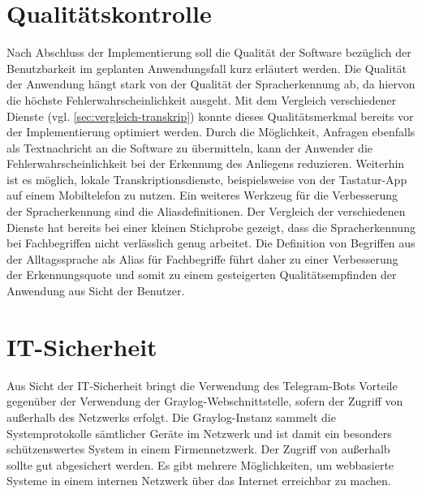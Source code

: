 \section{Qualitätskontrolle}

Nach Abschluss der Implementierung soll die Qualität der Software bezüglich der Benutzbarkeit im geplanten Anwendungsfall kurz erläutert werden. Die Qualität der Anwendung hängt stark von der Qualität der Spracherkennung ab, da hiervon die höchste Fehlerwahrscheinlichkeit ausgeht. Mit dem Vergleich verschiedener Dienste (vgl. \autoref{sec:vergleich-transkrip}) konnte dieses Qualitätsmerkmal bereits vor der Implementierung optimiert werden. Durch die Möglichkeit, Anfragen ebenfalls als Textnachricht an die Software zu übermitteln, kann der Anwender die Fehlerwahrscheinlichkeit bei der Erkennung des Anliegens reduzieren. Weiterhin ist es möglich, lokale Transkriptionsdienste, beispielsweise von der Tastatur-App auf einem Mobiltelefon zu nutzen. Ein weiteres Werkzeug für die Verbesserung der Spracherkennung sind die Aliasdefinitionen. Der Vergleich der verschiedenen Dienste hat bereits bei einer kleinen Stichprobe gezeigt, dass die Spracherkennung bei Fachbegriffen nicht verlässlich genug arbeitet. Die Definition von Begriffen aus der Alltagssprache als Alias für Fachbegriffe führt daher zu einer Verbesserung der Erkennungsquote und somit zu einem gesteigerten Qualitätsempfinden der Anwendung aus Sicht der Benutzer.

\section{IT-Sicherheit}

Aus Sicht der IT-Sicherheit bringt die Verwendung des Telegram-Bots Vorteile gegenüber der Verwendung der Graylog-Webschnittstelle, sofern der Zugriff von außerhalb des Netzwerks erfolgt. Die Graylog-Instanz sammelt die Systemprotokolle sämtlicher Geräte im Netzwerk und ist damit ein besonders schützenswertes System in einem Firmennetzwerk. Der Zugriff von außerhalb sollte gut abgesichert werden. Es gibt mehrere Möglichkeiten, um webbasierte Systeme in einem internen Netzwerk über das Internet erreichbar zu machen. 

